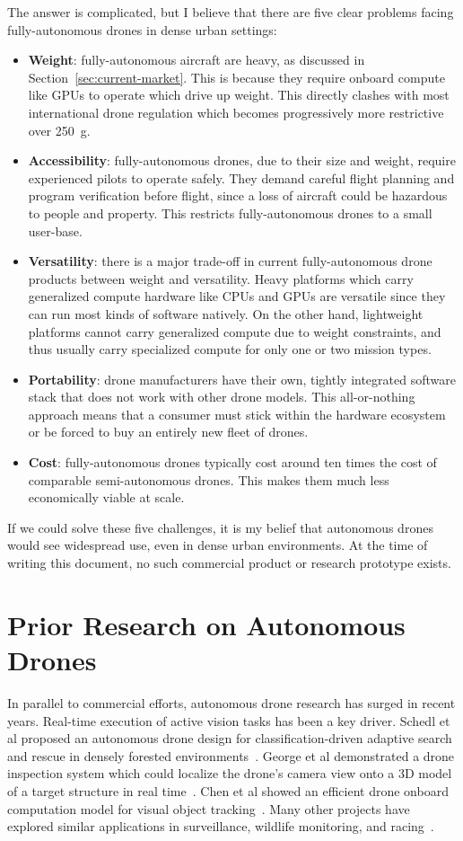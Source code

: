 The answer is complicated, but I believe that there are five clear problems facing fully-autonomous drones in dense urban settings:
\begin{itemize}
    \item \textbf{Weight}: fully-autonomous aircraft are heavy, as discussed in Section~\ref{sec:current-market}. This is because they require onboard compute like GPUs to operate which drive up weight. This directly clashes with most international drone regulation which becomes progressively more restrictive over 250~g.
    \item \textbf{Accessibility}: fully-autonomous drones, due to their size and weight, require experienced pilots to operate safely. They demand careful flight planning and program verification before flight, since a loss of aircraft could be hazardous to people and property. This restricts fully-autonomous drones to a small user-base.
    \item \textbf{Versatility}: there is a major trade-off in current fully-autonomous drone products between weight and versatility. Heavy platforms which carry generalized compute hardware like CPUs and GPUs are versatile since they can run most kinds of software natively. On the other hand, lightweight platforms cannot carry generalized compute due to weight constraints, and thus usually carry specialized compute for only one or two mission types.
    \item \textbf{Portability}: drone manufacturers have their own, tightly integrated software stack that does not work with other drone models. This all-or-nothing approach means that a consumer must stick within the hardware ecosystem or be forced to buy an entirely new fleet of drones.
    \item \textbf{Cost}: fully-autonomous drones typically cost around ten times the cost of comparable semi-autonomous drones. This makes them much less economically viable at scale. 
\end{itemize}
If we could solve these five challenges, it is my belief that autonomous drones would see widespread use, even in dense urban environments. At the time of writing this document, no such commercial product or research prototype exists.

\section{Prior Research on Autonomous Drones}
\label{sec:prior-work}
In parallel to commercial efforts, autonomous drone research has surged in recent years. Real-time execution of active vision tasks has been a key driver. Schedl et al proposed an autonomous drone design for classification-driven adaptive search and rescue in densely forested environments~\cite{Schedl2021}. George et al demonstrated a drone inspection system which could localize the drone's camera view onto a 3D model of a target structure in real time~\cite{George2019}. Chen et al showed an efficient drone onboard computation model for visual object tracking~\cite{Chen2018}. Many other projects have explored similar applications in surveillance, wildlife monitoring, and racing~\cite{Apvrille2014,Li2020,Devos2018,Alsalam2017,Ward2016}.  

